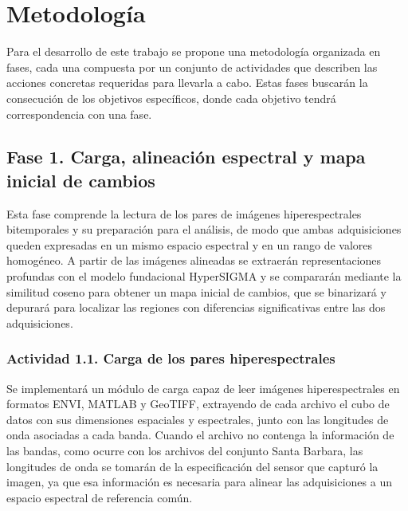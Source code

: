 \section{Metodología}

Para el desarrollo de este trabajo se propone una metodología organizada en fases, cada una compuesta por un conjunto de actividades que describen las acciones concretas requeridas para llevarla a cabo. Estas fases buscarán la consecución de los objetivos específicos, donde cada objetivo tendrá correspondencia con una fase.

\subsection{Fase 1. Carga, alineación espectral y mapa inicial de cambios}

Esta fase comprende la lectura de los pares de imágenes hiperespectrales bitemporales y su preparación para el análisis, de modo que ambas adquisiciones queden expresadas en un mismo espacio espectral y en un rango de valores homogéneo. A partir de las imágenes alineadas se extraerán representaciones profundas con el modelo fundacional HyperSIGMA y se compararán mediante la similitud coseno para obtener un mapa inicial de cambios, que se binarizará y depurará para localizar las regiones con diferencias significativas entre las dos adquisiciones.

\subsubsection{Actividad 1.1. Carga de los pares hiperespectrales}

Se implementará un módulo de carga capaz de leer imágenes hiperespectrales en formatos ENVI, MATLAB y GeoTIFF, extrayendo de cada archivo el cubo de datos con sus dimensiones espaciales y espectrales, junto con las longitudes de onda asociadas a cada banda. Cuando el archivo no contenga la información de las bandas, como ocurre con los archivos del conjunto Santa Barbara, las longitudes de onda se tomarán de la especificación del sensor que capturó la imagen, ya que esa información es necesaria para alinear las adquisiciones a un espacio espectral de referencia común.

